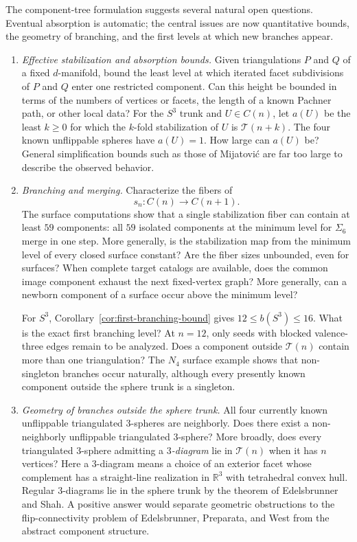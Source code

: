 \documentclass[11pt]{article}
\theoremstyle{remark}
\theoremstyle{plain}
\begin{document}
The component-tree formulation suggests several natural open questions.
Eventual absorption is automatic; the central issues are now
quantitative bounds, the geometry of branching, and the first levels at which
new branches appear.

\begin{enumerate}

\item[\textbf{(Q1)}] \emph{Effective stabilization and absorption bounds.}
Given triangulations \(P\) and \(Q\) of a fixed \(d\)-manifold, bound the
least level at which iterated facet subdivisions of \(P\) and \(Q\) enter
one restricted component.  Can this height be bounded in terms of the
numbers of vertices or facets, the length of a known Pachner path, or other
local data?  For the \(S^3\) trunk and \(U\in C(n)\), let \(a(U)\)
be the least \(k\ge0\) for which the \(k\)-fold stabilization of \(U\) is
\(\mathcal T(n+k)\).  The four known unflippable spheres have \(a(U)=1\).
How large can \(a(U)\) be?  General
simplification bounds such as those of Mijatovi\'c \cite{M03} are far too
large to describe the observed behavior.

\item[\textbf{(Q2)}] \emph{Branching and merging.}
Characterize the fibers of
\[
 s_n:C(n)\longrightarrow C(n+1).
\]
The surface computations show that a single stabilization fiber can contain
at least \(59\) components: all \(59\) isolated components at the minimum
level for \(\Sigma_6\) merge in one step.  More generally, is the stabilization map
from the minimum level of every closed surface constant?  Are the fiber
sizes unbounded, even for surfaces?  When complete target catalogs are
available, does the common image component exhaust the next fixed-vertex
graph?  More generally, can a newborn component of a surface occur above the
minimum level?

For \(S^3\), Corollary~\ref{cor:first-branching-bound} gives
\(12\le b(S^3)\le16\).  What is the exact first branching level?  At
\(n=12\), only seeds with blocked valence-three edges remain to be analyzed.
Does a component
outside \(\mathcal T(n)\) contain more than one triangulation?  The
\(N_4\) surface example shows that non-singleton branches occur naturally,
although every presently known component outside the sphere trunk is a
singleton.

\item[\textbf{(Q3)}] \emph{Geometry of branches outside the sphere trunk.}
All four currently known unflippable triangulated \(3\)-spheres are
neighborly.  Does there exist a non-neighborly unflippable triangulated
\(3\)-sphere?  More broadly, does every
triangulated \(3\)-sphere admitting a \emph{\(3\)-diagram} lie in
\(\mathcal T(n)\) when it has \(n\) vertices?  Here a \(3\)-diagram
means a choice of an exterior facet whose complement has a straight-line
realization in \(\mathbb R^3\) with tetrahedral convex hull.  Regular \(3\)-diagrams lie in the sphere trunk by
the theorem of Edelsbrunner and Shah.  A positive answer
would separate geometric
obstructions to the flip-connectivity problem of Edelsbrunner, Preparata,
and West \cite{EPW90} from the abstract component structure.


\end{enumerate}
\end{document}
